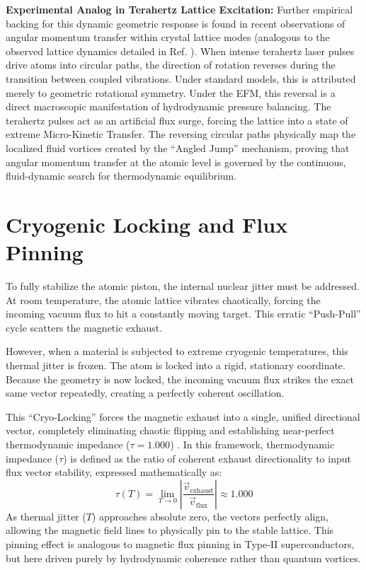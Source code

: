 \documentclass[11pt, a4paper]{article}
\begin{document}
  \textbf{Experimental Analog in Terahertz Lattice Excitation:} Further empirical backing for this dynamic geometric response is found in recent observations of angular momentum transfer within crystal lattice modes (analogous to the observed lattice dynamics detailed in Ref. \cite{nature2026}). When intense terahertz laser pulses drive atoms into circular paths, the direction of rotation reverses during the transition between coupled vibrations. Under standard models, this is attributed merely to geometric rotational symmetry. Under the EFM, this reversal is a direct macroscopic manifestation of hydrodynamic pressure balancing. The terahertz pulses act as an artificial flux surge, forcing the lattice into a state of extreme Micro-Kinetic Transfer. The reversing circular paths physically map the localized fluid vortices created by the ``Angled Jump'' mechanism, proving that angular momentum transfer at the atomic level is governed by the continuous, fluid-dynamic search for thermodynamic equilibrium.

\section{Cryogenic Locking and Flux Pinning}
  To fully stabilize the atomic piston, the internal nuclear jitter must be addressed. At room temperature, the atomic lattice vibrates chaotically, forcing the incoming vacuum flux to hit a constantly moving target. This erratic ``Push-Pull'' cycle scatters the magnetic exhaust. 
  
  However, when a material is subjected to extreme cryogenic temperatures, this thermal jitter is frozen. The atom is locked into a rigid, stationary coordinate. Because the geometry is now locked, the incoming vacuum flux strikes the exact same vector repeatedly, creating a perfectly coherent oscillation. 

  \clearpage
  This ``Cryo-Locking'' forces the magnetic exhaust into a single, unified directional vector, completely eliminating chaotic flipping and establishing near-perfect thermodynamic impedance ($\tau=1.000$) \cite{marabut2026m7}. In this framework, thermodynamic impedance ($\tau$) is defined as the ratio of coherent exhaust directionality to input flux vector stability, expressed mathematically as:
  \begin{equation}
    \tau(T) = \lim_{T \to 0} \left| \frac{\vec{v}_{\text{exhaust}}}{\vec{v}_{\text{flux}}} \right| \approx 1.000
  \end{equation}
  As thermal jitter ($T$) approaches absolute zero, the vectors perfectly align, allowing the magnetic field lines to physically pin to the stable lattice. This pinning effect is analogous to magnetic flux pinning in Type-II superconductors, but here driven purely by hydrodynamic coherence rather than quantum vortices.
\end{document}
